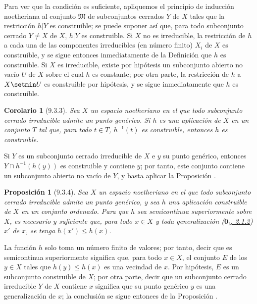\documentclass[10pt,oneside,openany]{book}
\theoremstyle{egaenv}\newtheorem*{env}{---}
\theoremstyle{egastatement}
\newtheorem*{proposition}{Proposición}
\newtheorem*{corollary}{Corolario}
\theoremstyle{egadescription}
\newcommand{\oldpage}[2][]{\marginnote{\normalfont\scriptsize\textbf{#1}\,|\,#2}\ignorespaces}
\renewcommand{\leq}{\leqslant}
\begin{document}
\oldpage[0\textsubscript{III}]{17}
Para ver que la condición es suficiente, apliquemos el principio de inducción noetheriana al conjunto $\mathfrak{M}$ de subconjuntos cerrados $Y$ de $X$ tales que la restricción $h|Y$ es construible; se puede suponer así que, para todo subconjunto cerrado $Y\ne X$ de $X$,
$h|Y$ es construible.
Si $X$ no es irreducible, la restricción de $h$ a cada una de las componentes irreducibles (en número finito) $X_i$ de $X$ es construible, y se sigue entonces inmediatamente de la Definición  que $h$ es construible.
Si $X$ es irreducible, existe por hipótesis un subconjunto abierto no vacío $U$ de $X$ sobre el cual $h$ es constante; por otra parte, la restricción de $h$ a $X\setmin U$ es construible por hipótesis, y se sigue inmediatamente que $h$ es construible.


\begin{corollary}[9.3.3]
\label{0.9.3.3}
\label{0.9.3.3-fr}
Sea $X$ un espacio noetheriano en el que todo subconjunto cerrado irreducible admite un punto genérico.
Si $h$ es una aplicación de $X$ en un conjunto $T$ tal que, para todo $t\in T$, $h^{-1}(t)$ es construible, entonces $h$ es construible.
\end{corollary}


Si $Y$ es un subconjunto cerrado irreducible de $X$ e $y$ su punto genérico, entonces $Y\cap h^{-1}(h(y))$ es construible y contiene $y$; por tanto,  este conjunto contiene un subconjunto abierto no vacío de $Y$, y basta aplicar la Proposición .


\begin{proposition}[9.3.4]
\label{0.9.3.4}
\label{0.9.3.4-fr}
Sea $X$ un espacio noetheriano en el que todo subconjunto cerrado irreducible admite un punto genérico, y sea $h$ una aplicación construible de $X$ en un conjunto ordenado.
Para que $h$ sea semicontinua superiormente sobre $X$, es necesario y suficiente que, para todo $x\in X$ y toda generalización \textup{(\hyperref[0.2.1.2-fr]{$\mathbf{0}_{\mathrm I}$, 2.1.2})} $x'$ de $x$, se tenga $h(x')\leq h(x)$.
\end{proposition}


La función $h$ solo toma un número finito de valores; por tanto, decir que es semicontinua superiormente significa que, para todo $x\in X$, el conjunto $E$ de los $y\in X$ tales que $h(y)\leq h(x)$ es una vecindad de $x$.
Por hipótesis, $E$ es un subconjunto construible de $X$; por otra parte, decir que un subconjunto cerrado irreducible $Y$ de $X$ contiene $x$ significa que su punto genérico $y$ es una generalización de $x$; la conclusión se sigue entonces de la Proposición .
\end{document}
